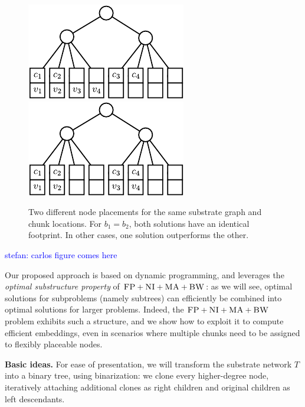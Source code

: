 \documentclass[9pt]{sigcomm-alternate}
\newcommand{\maciek}[1]{\textcolor{brown}{maciek: #1}}
\newcommand{\stefan}[1]{\textcolor{blue}{stefan: #1}}
\newcommand{\CC}{\textsc{NI}}
\newcommand{\FP}{\textsc{FP}}
\newcommand{\BW}{\textsc{BW}}
\newcommand{\MA}{\textsc{MA}}
\newcommand{\Tree}{\ensuremath{T}}
\newcommand{\CostTrans}{\ensuremath{b_1}}
\newcommand{\CostCom}{\ensuremath{b_2}}
\begin{document}
\begin{figure}
\includegraphics[width = 0.49\columnwidth]{figs/dynamic_good}
\hfill
\includegraphics[width = 0.49\columnwidth]{figs/dynamic_bad}
\caption{Two different node placements for the same substrate graph and chunk 
locations. For $\CostTrans = \CostCom$, both solutions have an identical 
footprint. In other cases, one solution outperforms the other.} 
\label{fig:dynamic_motivation}
\end{figure}

\stefan{carlos figure comes here}


Our proposed approach is based on dynamic programming, and
leverages the \emph{optimal substructure property} of $\FP+\CC+\MA+\BW$:
as we will see, optimal solutions for subproblems (namely subtrees)
can efficiently be combined into optimal solutions for larger problems.
Indeed, the $\FP+\CC+\MA+\BW$ problem
exhibits such a structure, and we show how to exploit it to
compute efficient embeddings, even in scenarios where multiple chunks
need to be assigned to flexibly placeable nodes.

\textbf{Basic ideas.} For ease of presentation, we will transform the substrate network $\Tree$
into a binary tree, using binarization:
we clone every higher-degree node,
iteratively attaching additional clones as right children
and original children as left descendants.
\end{document}
